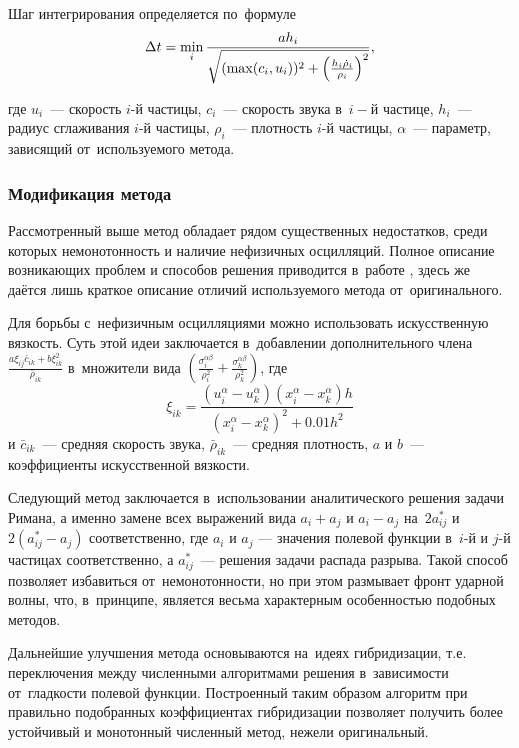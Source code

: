 \documentclass[thesis.tex]{subfiles}
\begin{document}
Шаг интегрирования определяется по~формуле
\begin{equation}
    \small
    \Delta t = \min_i \frac{a h_i}{\sqrt{(\max(c_i, u_i))^2 + \left( \frac{h_i \dot \rho_i}{\rho_i} \right)^2 }},
\end{equation}

где $u_i$~--- скорость $i$-й частицы, $c_i$~--- скорость звука в~$i-й$ частице, $h_i$~--- радиус сглаживания $i$-й частицы,
$\rho_i$~--- плотность $i$-й частицы, $\alpha$~--- параметр, зависящий от~используемого метода.

\subsubsection{Модификация метода}

Рассмотренный выше метод обладает рядом существенных недостатков, среди которых немонотонность и наличие нефизичных
осцилляций. Полное описание возникающих проблем и способов решения приводится в~работе \cite{потапов2009диссертация},
здесь же даётся лишь краткое описание отличий используемого метода от~оригинального.

Для борьбы с~нефизичным осцилляциями можно \cite{monaghan1989problem} использовать искусственную вязкость. Суть этой идеи
заключается в~добавлении дополнительного члена $\frac{a\xi_{ij}\bar c_{ik}+b\xi_{ik}^2}{\bar \rho_{ik}}$ в~множители
вида
$\left( \frac{\sigma_i^{\alpha\beta}}{\rho_i^2} + \frac{\sigma_k^{\alpha\beta}}{\rho_k^2}\right) $, где
\[
        \xi_{ik} = \frac{(u_i^\alpha-u_k^\alpha)(x_i^\alpha-x_k^\alpha)h}{(x_i^\alpha-x_k^\alpha)^2+0.01h^2}
\]
и $\bar c_{ik}$~--- средняя скорость звука, $\bar \rho_{ik}$~--- средняя плотность, $a$ и $b$~--- коэффициенты
искусственной вязкости.

Следующий метод \cite{monaghan1997sph} заключается в~использовании аналитического решения задачи Римана, а именно
замене всех выражений вида $a_i+a_j$ и $a_i-a_j$ на~$2a_{ij}^*$ и $2(a_{ij}^*-a_j)$ соответственно, где $a_i$ и $a_j$ ---
значения полевой функции в~$i$-й и $j$-й частицах соответственно, а $a_{ij}^*$~--- решения задачи распада разрыва. Такой
способ позволяет избавиться от~немонотонности, но при этом размывает фронт ударной волны, что, в~принципе, является весьма
характерным особенностью подобных методов.

Дальнейшие улучшения \cite{потапов2009диссертация} метода основываются на~идеях гибридизации, т.е. переключения между
численными алгоритмами решения в~зависимости от~гладкости полевой функции.  Построенный таким образом алгоритм
при правильно подобранных коэффициентах гибридизации позволяет получить более устойчивый и монотонный численный метод,
нежели оригинальный.
\end{document}
